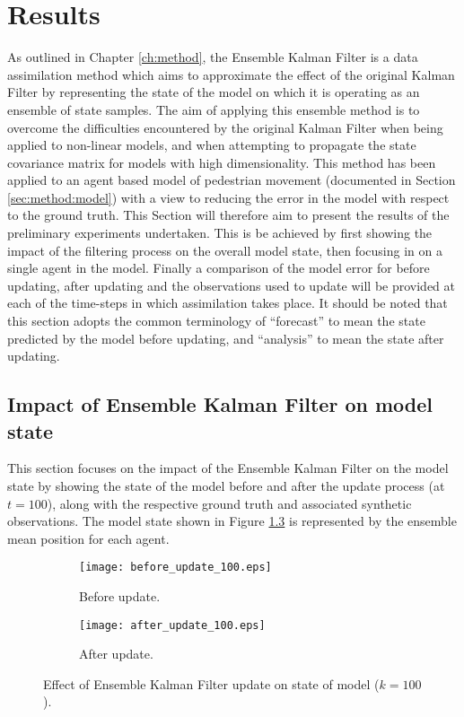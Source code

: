 \chapter{Results}\label{ch:results}

As outlined in Chapter \ref{ch:method}, the Ensemble Kalman Filter is a data
assimilation method which aims to approximate the effect of the original Kalman
Filter by representing the state of the model on which it is operating as an
ensemble of state samples.
The aim of applying this ensemble method is to overcome the difficulties
encountered by the original Kalman Filter when being applied to non-linear
models, and when attempting to propagate the state covariance matrix for models
with high dimensionality.
This method has been applied to an agent based model of pedestrian movement
(documented in Section \ref{sec:method:model}) with a view to reducing the error
in the model with respect to the ground truth.
This Section will therefore aim to present the results of the preliminary
experiments undertaken.
This is be achieved by first showing the impact of the filtering process on the
overall model state, then focusing in on a single agent in the model.
Finally a comparison of the model error for before updating, after updating and
the observations used to update will be provided at each of the time-steps in
which assimilation takes place.
It should be noted that this section adopts the common terminology of
``forecast'' to mean the state predicted by the model before updating, and
``analysis'' to mean the state after updating.

\section{Impact of Ensemble Kalman Filter on model
state}\label{sec:results:model}

This section focuses on the impact of the Ensemble Kalman Filter on the model
state by showing the state of the model before and after the update process (at
$t=100$), along with the respective ground truth and associated synthetic
observations.
The model state shown in Figure \ref{fig:enkf_abm} is represented by the
ensemble mean position for each agent.

\begin{figure}[h!]
    \centering
    \begin{subfigure}[h]{\textwidth}
        \texttt{[image: before\_update\_100.eps]}
        \caption{Before update.}\label{fig:abm_before}
    \end{subfigure}

    \begin{subfigure}[h]{\textwidth}
        \texttt{[image: after\_update\_100.eps]}
        \caption{After update.}\label{fig:abm_after}
    \end{subfigure}
    \caption[Effect of Ensemle Kalman Filter update on state of
    model.]{\centering Effect of Ensemble Kalman Filter update on state of model
    ($k=100$).}\label{fig:enkf_abm}
\end{figure}

